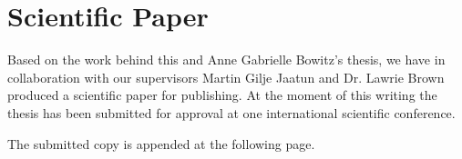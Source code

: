 \chapter{Scientific Paper}
\label{appendix:paper}
\acresetall

Based on the work behind this and Anne Gabrielle Bowitz's thesis, we have in
collaboration with our supervisors Martin Gilje Jaatun and Dr. Lawrie Brown
produced a scientific paper for publishing. At the moment of this writing the
thesis has been submitted for approval at one international scientific
conference.

The submitted copy is appended at the following page.

